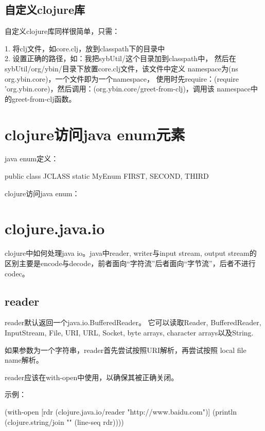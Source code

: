 ﻿\documentclass[a4paper,11pt]{article}
\begin{document}
  \subsection[自定义clojure库]{自定义clojure库}
  自定义clojure库同样很简单，只需：

  1. 将clj文件，如core.clj，放到classpath下的目录中\\
  2. 设置正确的路径，如：我把sybUtil/这个目录加到classpath中，
  然后在sybUtil/org/ybin/目录下放置core.clj文件，该文件中定义
  namespace为(ns org.ybin.core)，一个文件即为一个namespace，
  使用时先require：(require 'org.ybin.core)，然后调用：(org.ybin.core/greet-from-clj)，调用该
  namespace中的greet-from-clj函数。

  \section[clojure访问java enum元素]{clojure访问java enum元素}
  java enum定义：\par
  \begin{javacode}
public class JCLASS {
  static MyEnum {
    FIRST,
    SECOND,
    THIRD
  }
}
  \end{javacode}

  clojure访问java enum：\par


  \section[clojure.java.io]{clojure.java.io}
  clojure中如何处理java io。java中reader, writer与input stream, output stream的
  区别主要是encode与decode，前者面向“字符流”后者面向“字节流”，后者不进行codec。
  
  \subsection[reader]{reader}
  reader默认返回一个java.io.BufferedReader。
  它可以读取Reader, BufferedReader, InputStream, File,
  URI, URL, Socket, byte arrays, character arrays以及String.

  如果参数为一个字符串，reader首先尝试按照URI解析，再尝试按照
  local file name解析。

  reader应该在with-open中使用，以确保其被正确关闭。

  示例：\\
  \begin{schemecode}
    (with-open [rdr (clojure.java.io/reader "http://www.baidu.com")]
      (println (clojure.string/join "\n" (line-seq rdr))))
  \end{schemecode}
\end{document}
